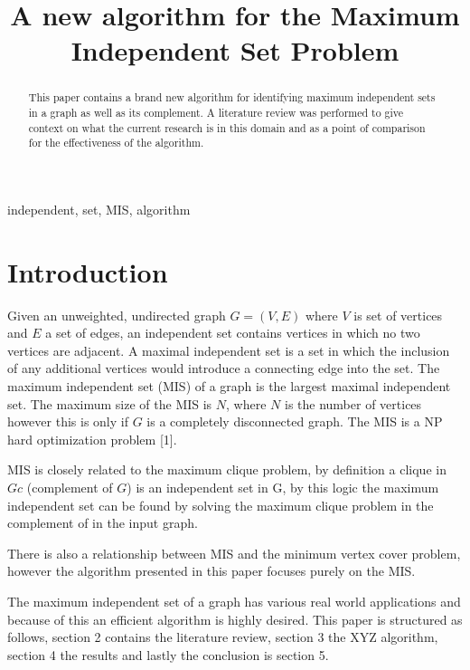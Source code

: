 \documentclass[conference]{IEEEtran}
\begin{document}
\title{A new algorithm for the Maximum Independent Set Problem}

\author{
}

\maketitle

\begin{abstract}
This paper contains a brand new algorithm for identifying maximum independent sets in a graph as well as its complement.
A literature review was performed to give context on what the current research is in this domain and as a point of 
comparison for the effectiveness of the algorithm.
\end{abstract}

\begin{IEEEkeywords}
independent, set, MIS, algorithm
\end{IEEEkeywords}

\section{Introduction}
Given an unweighted, undirected graph $G = (V, E)$ where $V$ is set of vertices and $E$ a set of edges, an 
independent set contains vertices in which no two vertices are adjacent. A maximal independent set is a set in 
which the inclusion of any additional vertices would introduce a connecting edge into the set. The maximum independent 
set (MIS) of a graph is the largest maximal independent set. The maximum size of the MIS is $N$, where $N$ is the number
of vertices however this is only if $G$ is a completely disconnected graph. The MIS is a NP hard optimization problem [1].

MIS is closely related to the maximum clique problem, by definition a clique in $Gc$ (complement of $G$) is an 
independent set in G, by this logic the maximum independent set can be found by solving the maximum clique problem in 
the complement of in the input graph. 

There is also a relationship between MIS and the minimum vertex cover problem, however the algorithm presented in this
paper focuses purely on the MIS.

The maximum independent set of a graph has various real world applications and because of this an efficient algorithm is 
highly desired. This paper is structured as follows, section 2 contains the literature review, section 3 the XYZ algorithm, section 4 
the results and lastly the conclusion is section 5.
\end{document}
